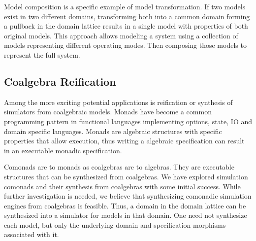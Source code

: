 \documentclass[12pt]{article}
\begin{document}
Model composition is a specific example of model transformation.  If
two models exist in two different domains, transforming both into a
common domain forming a pullback in the domain lattice results in a
single model with properties of both original models.  This approach
allows modeling a system using a collection of models representing
different operating modes.  Then composing those models to represent
the full system.

\subsection{Coalgebra Reification}

Among the more exciting potential applications is reification or
synthesis of simulators from coalgebraic models.  Monads have become a
common programming pattern in functional languages implementing
options, state, IO and domain specific languages.  Monads are
algebraic structures with specific properties that allow execution,
thus writing a algebraic specification can result in an executable
monadic specification.

Comonads are to monads as coalgebras are to algebras.  They are
executable structures that can be synthesized from coalgebras.   We
have explored simulation comonads and their synthesis from coalgebras
with some initial success.  While further investigation is needed, we
believe that synthesizing comonadic simulation engines from coalgebras
is feasible.  Thus, a domain in the domain lattice can be synthesized
into a simulator for models in that domain.  One need not synthesize
each model, but only the underlying domain and specification morphisms
associated with it.


\end{document}
